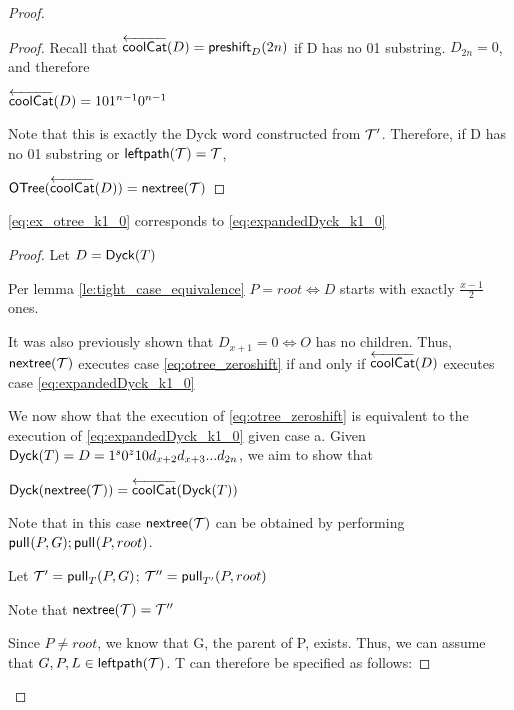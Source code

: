 \begin{proof}
\begin{proof}
    Recall that $\coolCat{D}=\preshift{D}{2n}$ if D has no 01 substring. $D_{2n}=0$, and therefore 

    $\coolCat{D}=101^{n-1}0^{n-1}$
     
     Note that this is exactly the Dyck word constructed from $\tree{T}'$.  Therefore, if D has no 01 substring or $\leftdown{\tree{T}}=\tree{T}$, 

     $\otree{\coolCat{D}}=\nextTree{T}$

\end{proof}
\begin{lemma}
    \eqref{eq:ex_otree_k1_0} corresponds to \eqref{eq:expandedDyck_k1_0}
\end{lemma}
\begin{proof}
    Let $D=\dyck{T}$

    Per lemma \ref{le:tight_case_equivalence} $P=root \iff D$ starts with exactly $\frac{x-1}{2}$ ones.  

    It was also previously shown that $D_{x+1}=0 \iff O$ has no children.  
    Thus, $\nextTree{T}$ executes case \eqref{eq:otree_zeroshift} 
    if and only if $\coolCat{D}$ executes case   \eqref{eq:expandedDyck_k1_0}

    \bigskip

    We now show that the execution of \eqref{eq:otree_zeroshift} is equivalent to the execution of \eqref{eq:expandedDyck_k1_0} given case a.
    Given $\dyck{T}=D=1^s0^{z}10d_{x+2}d_{x+3}...d_{2n}$, we aim to show that 

    $\dyck{\nextTree{T}}=\coolCat{\dyck{T}}$
    \bigskip

    Note that in this case $\nextTree{T}$ can be obtained by performing $\poppush{P}{G};\poppush{P}{root}$. 

	    Let $\tree{T}'=\poppush[T]{P}{G}$; $\tree{T}''=\poppush[T']{P}{root}$

	    Note that $\nextTree{T}=\tree{T}''$

    Since $P \ne root$, we know that G, the parent of P, exists. 
    Thus, we can assume that $G,P,L \in \leftdown{\tree{T}}$.  T can therefore be specified as follows: 





\end{proof}
\end{proof}
